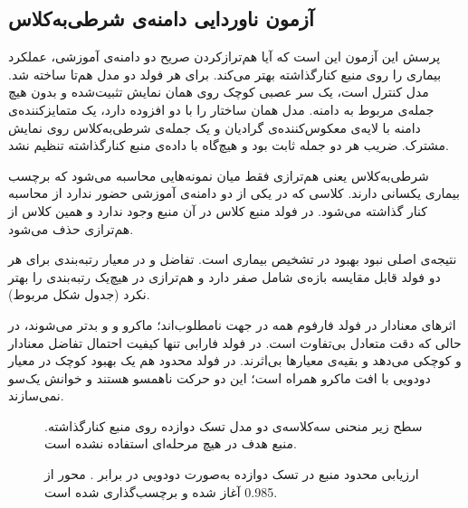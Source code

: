 \subsection{آزمون ناوردایی دامنه‌ی شرطی‌به‌کلاس}

پرسش این آزمون این است که آیا هم‌ترازکردن صریح دو دامنه‌ی آموزشی، عملکرد بیماری را روی منبع کنارگذاشته بهتر می‌کند. برای هر فولد دو مدل هم‌تا ساخته شد. مدل  کنترل است، یک سر عصبی کوچک روی همان نمایش تثبیت‌شده و بدون هیچ جمله‌ی مربوط به دامنه. مدل  همان ساختار را با دو افزوده دارد، یک متمایزکننده‌ی دامنه با لایه‌ی معکوس‌کننده‌ی گرادیان و یک جمله‌ی  شرطی‌به‌کلاس روی نمایش مشترک. ضریب هر دو جمله ثابت بود و هیچ‌گاه با داده‌ی منبع کنارگذاشته تنظیم نشد.

شرطی‌به‌کلاس یعنی هم‌ترازی فقط میان نمونه‌هایی محاسبه می‌شود که برچسب بیماری یکسانی دارند. کلاسی که در یکی از دو دامنه‌ی آموزشی حضور ندارد از محاسبه کنار گذاشته می‌شود. در فولد منبع  کلاس  در آن منبع وجود ندارد و همین کلاس از هم‌ترازی حذف می‌شود.



نتیجه‌ی اصلی نبود بهبود در تشخیص بیماری است. تفاضل  و  در معیار رتبه‌بندی برای هر دو فولد قابل مقایسه بازه‌ی شامل صفر دارد و هم‌ترازی در هیچ‌یک رتبه‌بندی را بهتر نکرد (جدول شکل مربوط).

اثرهای معنادار  در فولد فارفوم همه در جهت نامطلوب‌اند؛  ماکرو و  و  بدتر می‌شوند، در حالی که دقت متعادل بی‌تفاوت است. در فولد فارابی تنها کیفیت احتمال تفاضل معنادار و کوچکی می‌دهد و بقیه‌ی معیارها بی‌اثرند. در فولد محدود  هم یک بهبود کوچک در معیار دودویی با افت  ماکرو همراه است؛ این دو حرکت ناهمسو هستند و خوانش یک‌سو نمی‌سازند.

\begin{figure}[htbp]
  \centering
  \caption{سطح زیر منحنی سه‌کلاسه‌ی دو مدل تسک دوازده روی منبع کنارگذاشته. منبع هدف در هیچ مرحله‌ای استفاده نشده است.}
  \label{fig:U44}
\end{figure}

\begin{figure}[htbp]
  \centering
  \caption{ارزیابی محدود منبع  در تسک دوازده به‌صورت دودویی  در برابر . محور از 0.985 آغاز شده و برچسب‌گذاری شده است.}
  \label{fig:U45}
\end{figure}

